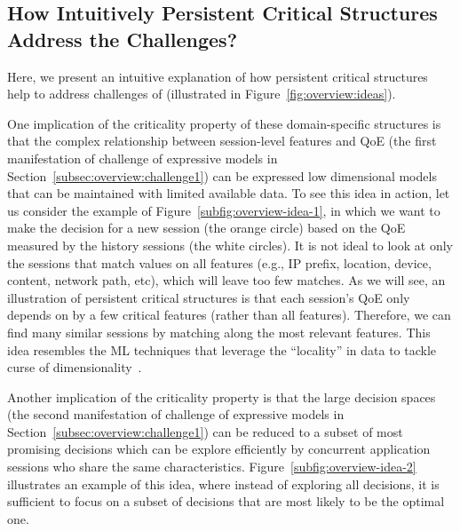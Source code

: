 \subsection{How Intuitively Persistent Critical Structures Address the Challenges?}
Here, we present an intuitive explanation of how persistent critical structures help to 
address challenges of \ddn (illustrated in Figure~\ref{fig:overview:ideas}).


One implication of the criticality property of these domain-specific structures is that 
the complex relationship between session-level features and QoE (the first manifestation 
of challenge of expressive models in Section~\ref{subsec:overview:challenge1}) can be 
expressed low dimensional models that can be maintained with limited available data.
To see this idea in action, let us consider the example of 
Figure~\ref{subfig:overview-idea-1},  in which we want to make the decision for a new 
session (the orange circle) based on the QoE measured by the history sessions 
(the white circles). It is not ideal to look at only the sessions that
match values on all features (e.g., IP prefix, location, device, content, network 
path, etc), which will leave too few matches.
As we will see, an illustration of persistent critical structures is that each session's 
QoE only depends on by a few critical features (rather than all features). Therefore, 
we can find many similar sessions by matching along the most relevant features. 
This idea resembles the ML techniques that leverage the ``locality'' in data to tackle 
curse of dimensionality~\cite{ml101}.

 Another implication of the criticality property is that the large decision spaces 
(the second manifestation of challenge of expressive models in 
Section~\ref{subsec:overview:challenge1}) can be reduced to a subset of most promising 
decisions which can be explore efficiently by concurrent application sessions who share
the same characteristics. Figure~\ref{subfig:overview-idea-2} illustrates an example of this 
idea, where instead of exploring all decisions, it is sufficient to focus on a subset of 
decisions that are most likely to be the optimal one.


